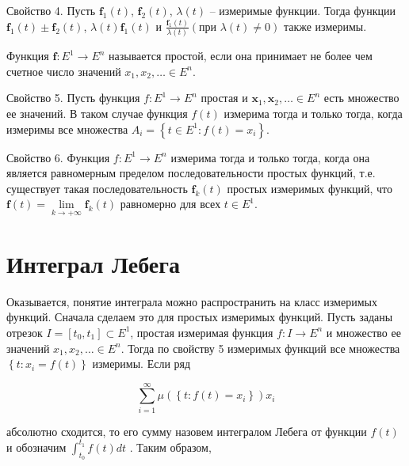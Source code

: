 \documentclass[8pt]{extarticle}
\begin{document}
Свойство 4. Пусть \({\mathbf{f}}_{1}\left( t\right)\), \({\mathbf{f}}_{2}\left( t\right)\), \(\lambda \left( t\right)\) -- измеримые функции. Тогда функции \({\mathbf{f}}_{1}\left( t\right)  \pm  {\mathbf{f}}_{2}\left( t\right)\), \(\lambda \left( t\right) {\mathbf{f}}_{1}\left( t\right)\) и \(\frac{{\mathbf{f}}_{1}\left( t\right) }{\lambda \left( t\right) }\left( {\text{при }\lambda \left( t\right)  \neq  0}\right)\) также измеримы.

Функция \(\mathbf{f} : {E}^{1} \rightarrow  {E}^{n}\) называется простой, если она принимает не более чем счетное число значений \({x}_{1},{x}_{2},\ldots  \in  {E}^{n}\).

Свойство 5. Пусть функция \(f : {E}^{1} \rightarrow  {E}^{n}\) простая и \({\mathbf{x}}_{1},{\mathbf{x}}_{2},\ldots  \in  {E}^{n}\) есть множество ее значений. В таком случае функция \(f\left( t\right)\) измерима тогда и только тогда, когда измеримы все множества \({A}_{i} = \left\{  {t \in  {E}^{1} : f\left( t\right)  = {x}_{i}}\right\}\).

Свойство 6. Функция \(f : {E}^{1} \rightarrow  {E}^{n}\) измерима тогда и только тогда, когда она является равномерным пределом последовательности простых функций, т.е. существует такая последовательность \({\mathbf{f}}_{k}\left( t\right)\) простых измеримых функций, что \(\mathbf{f}\left( t\right)  = \mathop{\lim }\limits_{{k \rightarrow   + \infty }}{\mathbf{f}}_{k}\left( t\right)\) равномерно для всех \(t \in  {E}^{1}\).

\section*{Интеграл Лебега}

Оказывается, понятие интеграла можно распространить на класс измеримых функций. Сначала сделаем это для простых измеримых функций. Пусть заданы отрезок \(I = \left\lbrack  {{t}_{0},{t}_{1}}\right\rbrack   \subset  {E}^{1}\), простая измеримая функция \(f : I \rightarrow  {E}^{n}\) и множество ее значений \({x}_{1},{x}_{2},\ldots  \in  {E}^{n}\). Тогда по свойству 5 измеримых функций все множества \(\left\{  {t : {x}_{i} = f\left( t\right) }\right\}\) измеримы. Если ряд

\[
\mathop{\sum }\limits_{{i = 1}}^{\infty }\mu \left( \left\{  {t : f\left( t\right)  = {x}_{i}}\right\}  \right) {x}_{i}
\]

абсолютно сходится, то его сумму назовем интегралом Лебега от функции \(f\left( t\right)\) и обозначим \({\int }_{{t}_{0}}^{{t}_{1}}f\left( t\right) {dt}\) . Таким образом,
\end{document}
